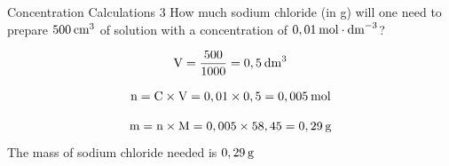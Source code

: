       \begin{wex}{Concentration Calculations 3 }
{
\label{m38712*id283476}How much sodium chloride (in g) will one need to prepare $500\phantom{\rule{2pt}{0ex}}{\text{cm}}^{3}$ of solution with a concentration of $0,01\phantom{\rule{2pt}{0ex}}\text{mol}\cdot \text{dm}^{-3}$?
   }
{
    \begin{equation*}
    \text{V}=\frac{500}{1 000}=0,5\phantom{\rule{2pt}{0ex}}{\text{dm}}^{3}
      \end{equation*}
      \label{m38712*id283565}\nopagebreak\noindent{}
        
    \begin{equation*}
    \text{n}=\text{C}\ensuremath{\times}\text{V}=0,01\ensuremath{\times}0,5=0,005\phantom{\rule{2pt}{0ex}}\text{mol}
      \end{equation*}
      \label{m38712*id283636}\nopagebreak\noindent{}
        
    \begin{equation*}
    \text{m}=\text{n}\ensuremath{\times}\text{M}=0,005\ensuremath{\times}58,45=0,29\phantom{\rule{2pt}{0ex}}\text{g}
      \end{equation*}
      \label{m38712*id283684}The mass of sodium chloride needed is $0,29\phantom{\rule{2pt}{0ex}}\text{g}$
 
}
    \end{wex}
    \noindent
\label{m38712*secfhsst!!!underscore!!!id1879}
